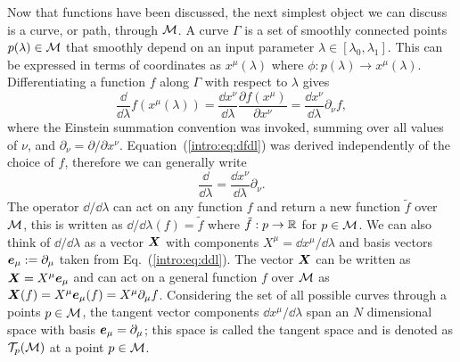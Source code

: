 Now that functions have been discussed, the next simplest object we can discuss is a curve, or path, through $\mathcal{M}$. A curve $\Gamma$ is a set of smoothly connected points $p(\lambda)\in \mathcal{M}$ that smoothly depend on an input parameter $\lambda \in [\lambda_0,\lambda_1]$. This can be expressed in terms of coordinates as $x^\mu(\lambda)$ where $\phi:p(\lambda) \rightarrow x^\mu(\lambda)$. Differentiating a function $f$ along $\Gamma$ with respect to $\lambda$ gives
\begin{equation} \label{intro:eq:dfdl}
\frac{\dd}{\dd \lambda}f(x^\mu(\lambda)) = \frac{\dd x^\nu}{\dd \lambda}\frac{\partial f(x^\mu)}{\partial x^\nu} = \frac{\dd x^\nu}{\dd \lambda}\partial_\nu f,
\end{equation}
where the Einstein summation convention was invoked, summing over all values of $\nu$, and $\partial_\nu = {\partial}/{\partial x^\nu}$. Equation~(\ref{intro:eq:dfdl}) was derived independently of the choice of $f$, therefore we can generally write
\begin{equation} \label{intro:eq:ddl}
\frac{\dd}{\dd \lambda} = \frac{\dd x^\nu}{\dd \lambda}\partial_\nu.
\end{equation}
The operator $\dd/\dd \lambda $ can act on any function $f$ and return a new function $\tilde{f}$ over $\mathcal{M}$, this is written as $\dd/\dd \lambda (f) = \tilde{f}$ where $\tilde{f}:p\rightarrow \mathbb{R}$ for $p\in\mathcal{M}$. We can also think of $\dd/\dd \lambda$ as a vector $\boldsymbol{X}$ with components $X^\mu=\dd x^\mu / \dd \lambda$ and basis vectors $\boldsymbol{e}_\mu:=\partial_\mu$ taken from Eq.~(\ref{intro:eq:ddl}). The vector $\boldsymbol{X}$ can be written as $\boldsymbol{X} = X^\mu \boldsymbol{e}_\mu$ and can act on a general function $f$ over $\mathcal{M}$ as $\boldsymbol{X}(f) = X^\mu \boldsymbol{e}_\mu(f) = X^\mu \partial_\mu f$. Considering the set of all possible curves through a points $p\in\mathcal{M}$, the tangent vector components $\dd x^\mu / \dd \lambda$ span an $N$ dimensional space with basis $\boldsymbol{e}_\mu = \partial_\mu$; this space is called the tangent space and is denoted as $\mathcal{T}_p(\mathcal{M})$ at a point $p\in\mathcal{M}$. 

